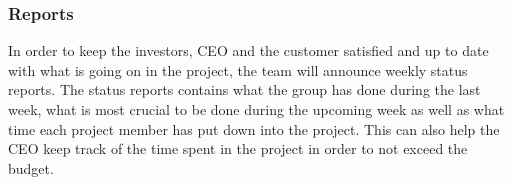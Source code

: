 \subsubsection{Reports}
In order to keep the investors, CEO and the customer satisfied and up to date with what is going on in the project, the team will announce weekly status reports. The status reports contains what the group has done during the last week, what is most crucial to be done during the upcoming week as well as what time each project member has put down into the project. This can also help the CEO keep track of the time spent in the project in order to not exceed the budget. 
